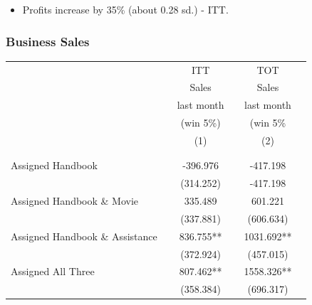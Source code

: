 \documentclass[10pt]{beamer}
\begin{document}
\begin{frame}
{{\begin{table}[t]
\end{table}}}
\begin{itemize}
\item Profits increase by 35\% (about 0.28 sd.) - ITT.
\end{itemize}
\end{frame}




\begin{frame}
\frametitle{Business Sales}
{\scriptsize{\begin{table}[t]
\centering
	\begin{tabular}{l*{5}{c}}
\hline
\hline
                &&ITT	        &&TOT \\
			   &&Sales	        &&Sales \\
				&&last month  		&&last month \\
			&&(win 5\%)			&&(win 5\% \\
				&&(1)				&&(2)	\\
&& \\
					\hline
&&\\
		

Assigned Handbook 					&&-396.976   	&&               -417.198		\\
       								 	&&        (314.252)   	&&          -417.198	\\

         							
Assigned Handbook \& Movie				&&335.489   	  	&& 601.221    		\\
       									&&       (337.881)  	&&            (606.634)	\\

         							
Assigned Handbook \& Assistance 	&&                   836.755**	&&                     1031.692** 	\\
       								 	&&        (372.924) 	&&            (457.015) 	\\
         							
Assigned All Three         		&&         807.462**  	&&                         1558.326**		\\
       								 	&&        (358.384)  	&&          (696.317)   	\\


\end{tabular}
\end{table}}}
\end{frame}
\end{document}
